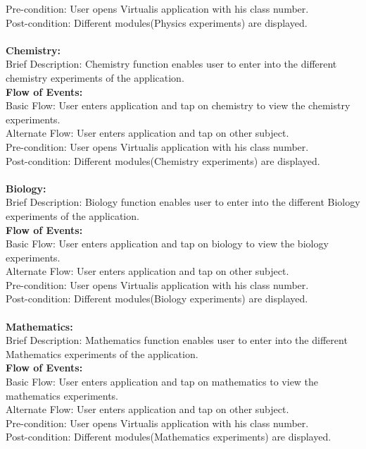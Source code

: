 \documentclass[12pt]{report}
\begin{document}
Pre-condition: User opens Virtualis application with his class number. \\
Post-condition: Different modules(Physics experiments) are displayed. \\
\\
\textbf{Chemistry:} \\
Brief Description: Chemistry function enables user to enter into the different chemistry experiments of the application. \\
\textbf{Flow of Events: }\\
\indent	 Basic Flow: User enters application and tap on chemistry  to view the chemistry experiments. \\
\indent	Alternate Flow: User enters application and tap on other subject.\\ 
Pre-condition: User opens Virtualis application with his class number. \\
Post-condition: Different modules(Chemistry experiments) are displayed. 
\\
\\
\textbf{Biology: }\\
Brief Description: Biology function enables user to enter into the different Biology experiments of the application.\\ 
\textbf{Flow of Events: }\\
\indent	 Basic Flow: User enters application and tap on biology to view the biology experiments. \\
\indent	Alternate Flow: User enters application and tap on other subject. \\
Pre-condition: User opens Virtualis application with his class number. \\
Post-condition: Different modules(Biology experiments) are displayed. 
\\
\\
\textbf{Mathematics: }\\
Brief Description: Mathematics function enables user to enter into the different Mathematics experiments of the application. \\
\textbf{Flow of Events: }\\
\indent	  Basic Flow: User enters application and tap on mathematics to view the mathematics experiments. \\
\indent	Alternate Flow: User enters application and tap on other subject.\\ 
Pre-condition: User opens Virtualis application with his class number. \\
Post-condition: Different modules(Mathematics experiments) are displayed. 
\end{document}
